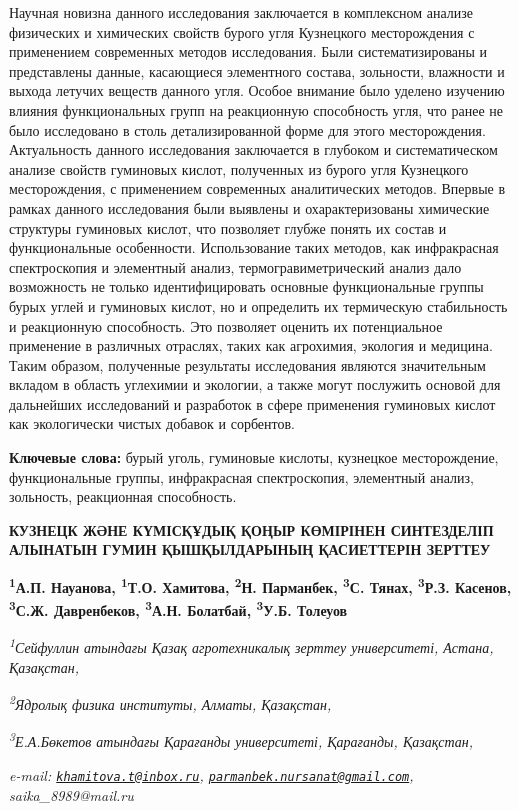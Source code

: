 Научная новизна данного исследования заключается в комплексном анализе
физических и химических свойств бурого угля Кузнецкого месторождения с
применением современных методов исследования. Были систематизированы и
представлены данные, касающиеся элементного состава, зольности,
влажности и выхода летучих веществ данного угля. Особое внимание было
уделено изучению влияния функциональных групп на реакционную способность
угля, что ранее не было исследовано в столь детализированной форме для
этого месторождения. Актуальность данного исследования заключается в
глубоком и систематическом анализе свойств гуминовых кислот, полученных
из бурого угля Кузнецкого месторождения, с применением современных
аналитических методов. Впервые в рамках данного исследования были
выявлены и охарактеризованы химические структуры гуминовых кислот, что
позволяет глубже понять их состав и функциональные особенности.
Использование таких методов, как инфракрасная спектроскопия и элементный
анализ, термогравиметрический анализ дало возможность не только
идентифицировать основные функциональные группы бурых углей и гуминовых
кислот, но и определить их термическую стабильность и реакционную
способность. Это позволяет оценить их потенциальное применение в
различных отраслях, таких как агрохимия, экология и медицина. Таким
образом, полученные результаты исследования являются значительным
вкладом в область углехимии и экологии, а также могут послужить основой
для дальнейших исследований и разработок в сфере применения гуминовых
кислот как экологически чистых добавок и сорбентов.

{\bfseries Ключевые слова:} бурый уголь, гуминовые кислоты, кузнецкое
месторождение, функциональные группы, инфракрасная спектроскопия,
элементный анализ, зольность, реакционная способность.

\begin{articleheader}
{\bfseries КУЗНЕЦК ЖӘНЕ КҮМІСҚҰДЫҚ ҚОҢЫР КӨМІРІНЕН СИНТЕЗДЕЛІП АЛЫНАТЫН ГУМИН ҚЫШҚЫЛДАРЫНЫҢ ҚАСИЕТТЕРІН ЗЕРТТЕУ}

{\bfseries
\textsuperscript{1}А.П. Науанова,
\textsuperscript{1}Т.О. Хамитова\textsuperscript{\envelope },
\textsuperscript{2}Н. Парманбек\textsuperscript{\envelope },
\textsuperscript{3}С. Тянах\textsuperscript{\envelope },
\textsuperscript{3}Р.З. Касенов,
\textsuperscript{3}С.Ж. Давренбеков,
\textsuperscript{3}А.Н. Болатбай,
\textsuperscript{3}У.Б. Толеуов}
\end{articleheader}

\begin{affiliation}
\emph{\textsuperscript{1}Сейфуллин атындағы Қазақ агротехникалық зерттеу университеті, Астана, Қазақстан,}

\emph{\textsuperscript{2}Ядролық физика институты, Алматы, Қазақстан,}

\emph{\textsuperscript{3}Е.А.Бөкетов атындағы Қарағанды университеті, Қарағанды, Қазақстан,}

\emph{e-mail: \href{mailto:khamitova.t@inbox.ru}{\nolinkurl{khamitova.t@inbox.ru}}, \href{mailto:parmanbek.nursanat@gmail.com}{\nolinkurl{parmanbek.nursanat@gmail.com}}, saika\_8989@mail.ru}
\end{affiliation}

